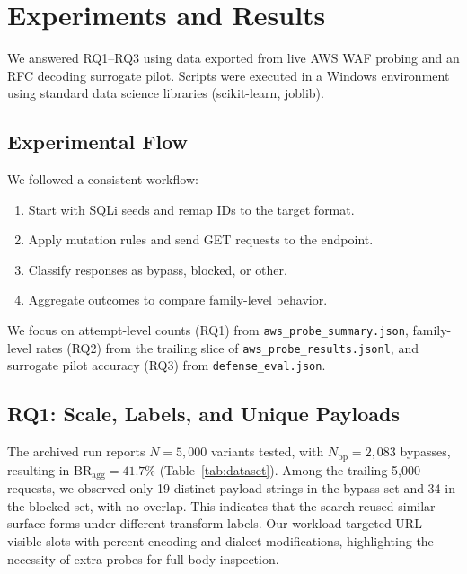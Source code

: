 \section{Experiments and Results}
\label{sec:experiments}
We answered RQ1--RQ3 using data exported from live AWS WAF probing and an RFC decoding surrogate pilot. Scripts were executed in a Windows environment using standard data science libraries (scikit-learn, joblib).

\subsection{Experimental Flow}
We followed a consistent workflow:
\begin{enumerate}
  \item Start with SQLi seeds and remap IDs to the target format.
  \item Apply mutation rules and send GET requests to the endpoint.
  \item Classify responses as \textsf{bypass}, \textsf{blocked}, or \textsf{other}.
  \item Aggregate outcomes to compare family-level behavior.
\end{enumerate}

We focus on attempt-level counts (RQ1) from \texttt{aws\_probe\_summary.json}, family-level rates (RQ2) from the trailing slice of \texttt{aws\_probe\_results.jsonl}, and surrogate pilot accuracy (RQ3) from \texttt{defense\_eval.json}.

\subsection{RQ1: Scale, Labels, and Unique Payloads}
The archived run reports $N=5{,}000$ variants tested, with $N_{\mathrm{bp}}=2{,}083$ bypasses, resulting in $\mathrm{BR}_{\mathrm{agg}}=41.7\%$ (Table~\ref{tab:dataset}). Among the trailing 5,000 requests, we observed only 19 distinct payload strings in the bypass set and 34 in the blocked set, with no overlap. This indicates that the search reused similar surface forms under different transform labels. Our workload targeted URL-visible slots with percent-encoding and dialect modifications, highlighting the necessity of extra probes for full-body inspection.

